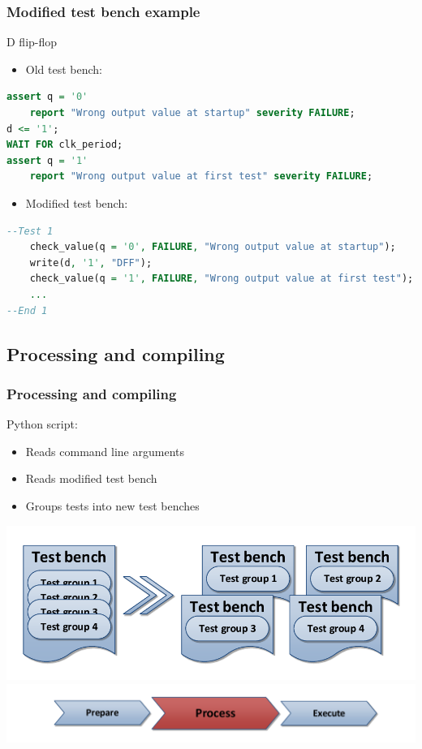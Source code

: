 \documentclass[british,10pt]{beamer}
\begin{document}
\begin{frame}[fragile]\frametitle{Modified test bench example}
D flip-flop
\begin{itemize}
\item Old test bench:
\end{itemize}
\begin{lstlisting}[language=VHDL, tabsize=4, frame=single, framesep=2mm, belowskip=5pt, aboveskip=5pt, showstringspaces=false, basicstyle=\scriptsize]
assert q = '0'
    report "Wrong output value at startup" severity FAILURE;
d <= '1';
WAIT FOR clk_period;
assert q = '1'
    report "Wrong output value at first test" severity FAILURE;
\end{lstlisting}
\vskip1pt
\begin{itemize}
\item Modified test bench:
\end{itemize}
\begin{lstlisting}[language=VHDL, tabsize=4, frame=single, framesep=2mm, belowskip=5pt, aboveskip=5pt, showstringspaces=false, basicstyle=\scriptsize]
--Test 1
    check_value(q = '0', FAILURE, "Wrong output value at startup");
    write(d, '1', "DFF");
    check_value(q = '1', FAILURE, "Wrong output value at first test");
    ...
--End 1
\end{lstlisting}
\end{frame}

\subsection{Processing and compiling}
\begin{frame}\frametitle{Processing and compiling}
\vskip20pt
Python script:
\begin{itemize}
\item Reads command line arguments
\item Reads modified test bench
\item Groups tests into new test benches
\end{itemize}
\vskip5pt
\centering
\includegraphics[width=.8\textwidth]{images/tbsplit.pdf}
\vskip20pt
\includegraphics[width=.7\textwidth]{images/ppe2.pdf}
\end{frame}
\end{document}
